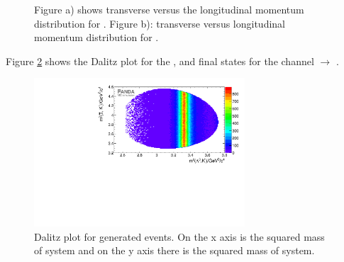 \begin{figure}
	\caption{\propose Figure a) shows transverse versus the longitudinal momentum distribution for \anticascade. Figure b):
			transverse versus longitudinal momentum distribution for \excitedcascade.}
	\label{fig:MC_xi_pt_vs_pz}
\end{figure}

Figure \ref{fig:eventgeneration_Dalitz} shows the Dalitz plot for the \lam, \kminus and \anticascade final states for 
the channel \pbarp $\rightarrow$ \excitedcascade \anticascade. 

\begin{figure}
	\centering
	\includegraphics[width=0.7\textwidth]{./plots/Dalitzplot_MC.pdf}
	\caption{\propose \anticascade\lam\kminus Dalitz plot for generated events. On the x axis is the squared mass of \lam\kminus system and on the y axis there is the squared mass of \anticascade\kminus system.}
	\label{fig:eventgeneration_Dalitz}
\end{figure}

